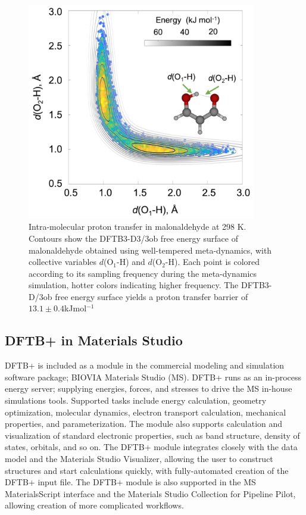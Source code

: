 \documentclass[reprint,onecolumn,superscriptaddress]{revtex4-1}
\newcommand{\dftbp}{DFTB+}
\begin{document}
\begin{figure}[htbp]
  \centering
  \includegraphics[width=10cm]{mtdfigure.png}
  \caption{Intra-molecular proton transfer in malonaldehyde at 298 K. Contours
    show the DFTB3-D3/3ob free energy surface of malonaldehyde obtained using
    well-tempered meta-dynamics, with collective variables $d$(O$_{1}$-H) and
    $d$(O$_{2}$-H). Each point is colored according to its sampling frequency
    during the meta-dynamics simulation, hotter colors indicating higher
    frequency.  The DFTB3-D/3ob free energy surface yields a proton transfer
    barrier of $13.1 \pm 0.4$\;kJ\;mol$^{-1}$}
  \label{fig:mtd}
\end{figure}

\subsection{\dftbp{} in Materials Studio}

\dftbp{} is included as a module in the commercial modeling and simulation
software package; BIOVIA Materials Studio (MS).\cite{BIOVIA-MS} \dftbp{} runs as
an in-process energy server; supplying energies, forces, and stresses to drive
the MS in-house simulations tools. Supported tasks include energy calculation,
geometry optimization, molecular dynamics, electron transport calculation,
mechanical properties, and parameterization. The module also supports
calculation and visualization of standard electronic properties, such as band
structure, density of states, orbitals, and so on. The \dftbp{} module
integrates closely with the data model and the Materials Studio Visualizer,
allowing the user to construct structures and start calculations quickly, with
fully-automated creation of the \dftbp{} input file.  The \dftbp{} module is
also supported in the MS MaterialsScript interface and the Materials Studio
Collection for Pipeline Pilot,\cite{BIOVIA-MSC} allowing creation of more
complicated workflows.\cite{C7RA04120A,C6CP03987A}
\end{document}
